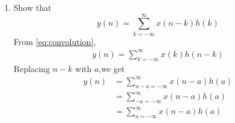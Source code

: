\documentclass[journal,12pt,twocolumn]{IEEEtran}
\renewcommand\thesection{\arabic{section}}
\begin{document}
\begin{enumerate}[label=\thesection.\arabic*]
    \item Show that
      \begin{equation}
        y(n) =  \sum_{k=-\infty}^{\infty}x(n-k)h(k)
      \end{equation}
    \solution From \eqref{eq:convolution}, 
      \begin{align}
        y(n) = \sum_{k=-\infty}^{\infty}x(k)h(n-k)
      \end{align}
      Replacing $n-k$ with $a$,we get
      \begin{align}
        y(n) &= \sum_{n-a=-\infty}^{\infty}x(n-a)h(a)\\
        &=\sum_{-a=-\infty}^{\infty}x(n-a)h(a)\\
        &=\sum_{a=-\infty}^{\infty}x(n-a)h(a)
      \end{align}
    \end{enumerate}
\end{document}
